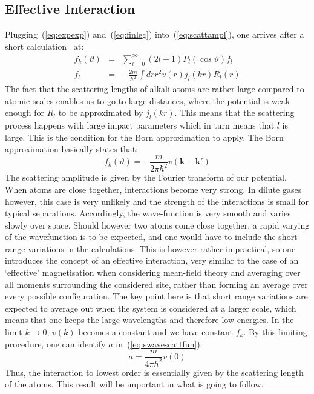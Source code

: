 \subsection{Effective Interaction}
Plugging~(\ref{eq:expexp}) and~(\ref{eq:finleg}) into~(\ref{eq:scattampl}), one arrives after a short calculation~\cite{schwabl} at:
\begin{eqnarray}
	f_k(\vartheta)&=&\sum_{l=0}^{\infty}(2l+1)P_l(\cos\vartheta)f_l\label{eq:fexp}\\
	f_l&=&-\frac{2m}{\hbar^2}\int dr r^2 v(r)j_l(kr)R_l(r)
\end{eqnarray}
The fact that the scattering lengths of alkali atoms are rather large compared to atomic scales enables us to go to large distances, where the potential is weak 
enough for $R_l$ to be approximated by $j_l(kr)$. This means that the scattering process happens with large impact parameters which in turn means that $l$ is large. 
This is the condition for the Born approximation to apply. The Born approximation basically states that:
\begin{equation}\label{eq:born}
	f_k(\vartheta)=-\frac{m}{2\pi\hbar^2}v(\mathbf{k}-\mathbf{k}')
\end{equation}
The scattering amplitude is given by the Fourier transform of our potential. When atoms are close together, interactions become very strong. In dilute gases however, this case is very 
unlikely and the strength of the interactions is small for typical separations. Accordingly, the wave-function is very smooth and varies slowly over space. Should 
however two atoms come close together, a rapid varying of the wavefunction is to be expected, and one would have to include the short range variations in the 
calculations. This is however rather impractical, so one introduces the concept of an effective interaction, very similar to the case of an `effective' magnetisation 
when considering mean-field theory and averaging over all moments surrounding the considered site, rather than forming an average over every possible configuration. 
The key point here is that short range variations are expected to average out when the system is considered at a larger scale, which means that one keeps the large 
wavelengths and therefore low energies. In the limit $k\rightarrow0$, $v(k)$ becomes a constant and we have constant $f_k$. By this limiting procedure, one can identify $a$ in~(\ref{eq:swavescattfun}):
\begin{equation}\label{eq:aborn}
	a=\frac{m}{4\pi\hbar^2}v(0)
\end{equation} 
Thus, the interaction to lowest order is essentially given by the scattering length of the atoms. This result will be important in what is going to follow.

